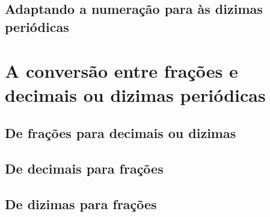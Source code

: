 \subsection{Adaptando a numeração para às dizimas periódicas}

\section{A conversão entre frações e decimais ou dizimas periódicas}

\subsection{De frações para decimais ou dizimas}

\subsection{De decimais para frações}

\subsection{De dizimas para frações}

